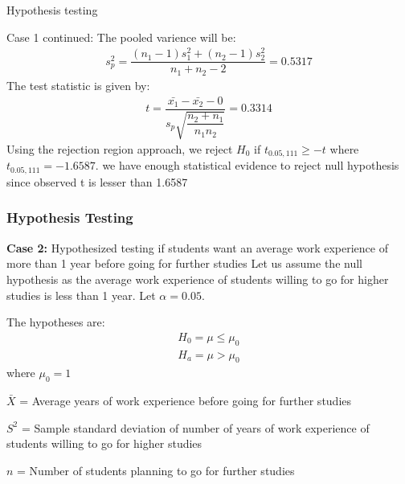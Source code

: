 \documentclass{beamer}
\begin{document}
    \begin{frame}{Hypothesis testing}
    \begin{block}{Case 1 continued:}
        The pooled varience will be:
           \begin{align}
               s^2_p=\dfrac{(n_1-1)s^2_1+(n_2-1)s^2_2}{n_1+n_2-2}=0.5317
           \end{align}
           The test statistic is given by:
           \begin{align}
               t=\dfrac{\bar{x_1}-\bar{x_2}-0}{s_p\sqrt{\dfrac{n_2+n_1}{n_1n_2}}}=0.3314
           \end{align}
           Using the rejection region approach, we reject $H_0$ if $t_{0.05,111}\geq -t$ where $t_{0.05,111}=-1.6587$. we have enough statistical evidence to reject null hypothesis since observed t is lesser than 1.6587
           
    \end{block}
        
    \end{frame}

\begin{frame}
  \frametitle{Hypothesis Testing}
  \begin{block}{\textbf{Case 2:}{ Hypothesized testing if students want an average work experience of more than 1 year before going for further studies }}
     Let us assume the null hypothesis as the average work experience of students willing to go for higher studies is  less than 1 year. Let $\alpha = 0.05$.

     The hypotheses are:
      \begin{align*}
          H_0=\mu\leq \mu_0\\
          H_a=\mu > \mu_0
      \end{align*}
      where $\mu_0 = 1$

     \begin{enumerate*}
         \item  $\bar{X}$ = Average years of work experience before going for further studies\\
         \item  $S^2$ = Sample standard deviation of number of years of work experience of students willing to go for higher studies\\
         \item $n$ = Number of students planning to go for further studies\\
     \end{enumerate*}
        \end{block}
    \end{frame}
\end{document}
